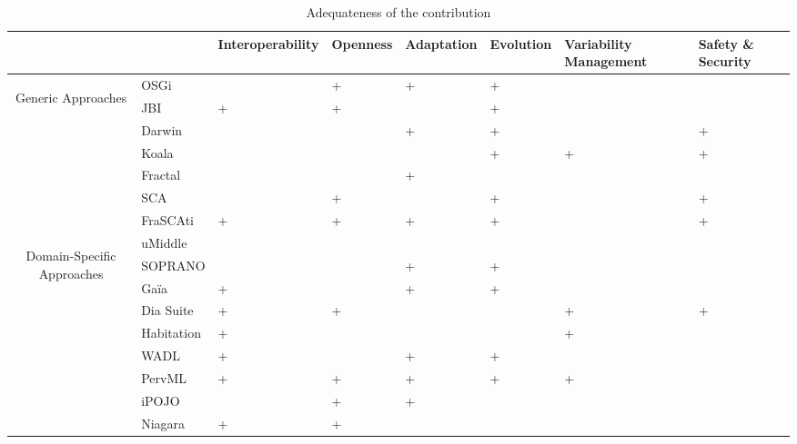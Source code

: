 \begin{table}[h!]
\begin{tabular}{cm{}|| >{\centering\arraybackslash}m{}| >{\centering\arraybackslash}m{}| >{\centering\arraybackslash}m{}| >{\centering\arraybackslash}m{}| >{\centering}m{}| >{\centering\arraybackslash}m{}|}
 & & {\tiny Interoperability} & {\tiny Openness} & {\tiny Adaptation} & {\tiny Evolution} & {\tiny Variability Management} & {\tiny Safety \& Security}\\
 \hline\hline
 \multirow{7}{8mm}{\begin{sideways}\parbox{25mm}{\centering Generic Approaches}\end{sideways}}
 &{\small OSGi} 		&  & + & + & + &  &  \\ 
 &{\small JBI} 			& + & + &  & + &  &  \\
 \cline{2-8}%
 &{\small Darwin} 		&  &  & + & + &   & + \\ 
 &{\small Koala} 		&  &  &   & + & + & + \\
 &{\small Fractal} 		&  &  & + &   &   &  \\
 \cline{2-8}%
 &{\small SCA} 			&   & + &  & + &  & +\\
 &{\small FraSCAti}     & + & + & + & + &  & + \\
 \hline\hline
 \multirow{9}{8mm}{\begin{sideways}\parbox{30mm}{\centering  Domain-Specific Approaches}\end{sideways}} 
 &{\small uMiddle} 		&  &  &  &  &  &  \\
 &{\small SOPRANO} 		&  &  & + & + &  &  \\
 &{\small Ga\"ia} 		& + &  & + & + &  &  \\
 &{\small Dia Suite} 	& + & + &  &  & + & + \\
 &{\small Habitation} 	& + &  &  &  & + &  \\
 &{\small WADL} 		& + &  & + & + &  &  \\
 &{\small PervML} 		& + & + & + & + & + &  \\
 &{\small iPOJO} 		&  & + & + &  &  &  \\
 &{\small Niagara} 		& + & + &  &  &  &  \\
 \hline
\end{tabular}
\caption{Adequateness of the contribution}
\label{tab:adequatness}
\end{table}

